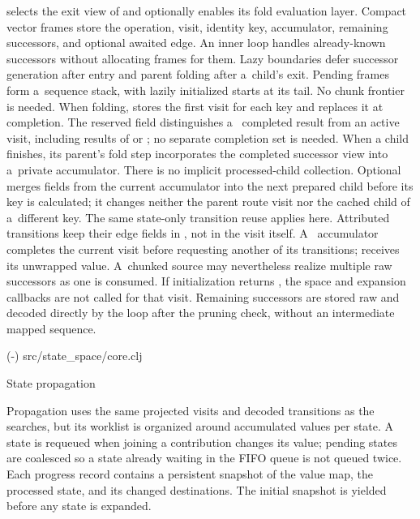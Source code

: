 { selects the exit view of  and optionally
enables its fold evaluation layer. Compact vector frames store the
operation, visit, identity key, accumulator, remaining successors, and
optional awaited edge. An inner loop handles already-known successors
without allocating frames for them. Lazy boundaries defer successor
generation after entry and parent folding after a~child's exit.
Pending frames form a~sequence stack, with lazily initialized starts at
its tail. No chunk frontier is needed.
When folding,  stores the first visit for each key and replaces
it at completion. The reserved  field distinguishes a~
completed result from an active visit, including results of  or
; no separate completion set is needed.
When a child finishes, its parent's fold step incorporates the completed
successor view into a~private accumulator. There is no implicit
processed-child collection.
Optional  merges fields from the current accumulator into
the next prepared child before its key is calculated; it changes neither
the parent route visit nor the cached child of a~different key.
The same state-only transition reuse applies here. Attributed transitions
keep their edge fields in , not in the visit itself.
A~ accumulator completes the current visit before requesting
another of its transitions;  receives its unwrapped value.
A~chunked source may nevertheless realize multiple raw successors as one
is consumed. If initialization returns , the space and
expansion callbacks are not called for that visit.
Remaining successors are stored raw and decoded directly by the loop
after the pruning check, without an intermediate mapped sequence.

\begingroup
\typosize[8/9]
\verbinput {} (\the\sourcefirstline-\the\sourcelastline) src/state_space/core.clj
\endgroup

\secc State propagation

Propagation uses the same projected visits and decoded transitions as the
searches, but its worklist is organized around accumulated values per state.
A state is requeued when joining a contribution changes its value; pending
states are coalesced so a state already waiting in the FIFO queue is not
queued twice. Each progress record contains a persistent snapshot of the value
map, the processed state, and its changed destinations. The initial snapshot
is yielded before any state is expanded.

}
